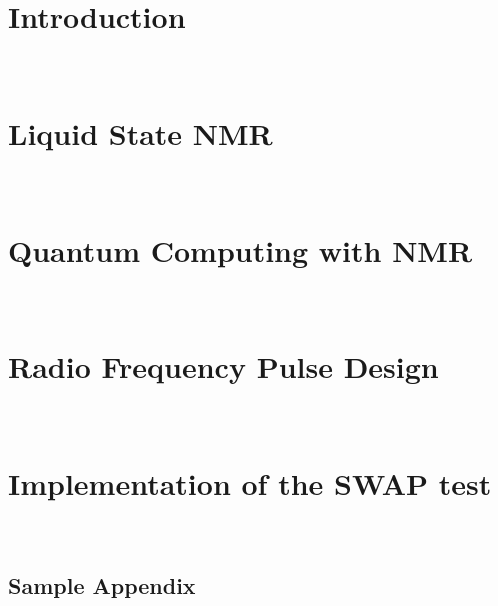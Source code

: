\documentclass[a4paper, 11pt, openany]{book}
\begin{document}
\chapter{Introduction}
~\label{chap:introduction}


\chapter{Liquid State NMR}
~\label{chap:liquidstateNMR}


\chapter{Quantum Computing with NMR}
~\label{chap:quantum_nmr}


\chapter{Radio Frequency Pulse Design}
~\label{chap:pulse_design}


\chapter{Implementation of the SWAP test}
~\label{chap:swaptest}




\titleformat{\chapter}[display]	%
{\normalfont\huge\bfseries}{\chaptertitlename\ \thechapter}{20pt}{\Huge}


\begin{appendix}			%
\chapter{Sample Appendix}	%
~\label{app: sample appendix}

%

\end{appendix}
\end{document}

